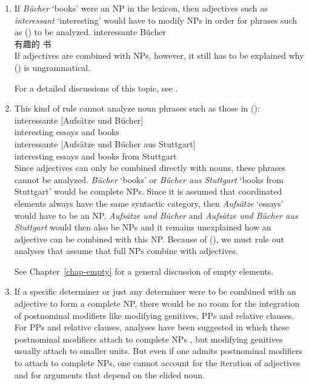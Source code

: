 \begin{enumerate}
\item %

If \emph{Bücher} `books' were an NP in the lexicon, then adjectives such as \emph{interessant} `interesting' would have to modify
NPs in order for phrases such as () to be analyzed.
\ea
\gll interessante Bücher\\
     有趣的 书\\
\z
If adjectives are combined with NPs, however, it still has to be explained why () is ungrammatical.
\z

For a detailed discussions of this topic, see .\nocite{MuellerLehrbuch1}

\item %

This kind of rule cannot analyze noun phrases such as those in ():
\eal
\ex 
\gll interessante [Aufsätze und Bücher]\\
     interesting \spacebr{}essays and books\\
\ex 
\gll interessante [Aufsätze und Bücher aus Stuttgart]\\
     interesting \spacebr{}essays and books from Stuttgart\\
\zl
Since adjectives can only be combined directly with nouns, these phrases cannot be analyzed. 
 \emph{Bücher} `books' or \emph{Bücher aus Stuttgart} `books from Stuttgart' would be complete NPs.
 Since it is assumed that coordinated elements always have the same syntactic category, then \emph{Aufsätze} `essays'
 would have to be an NP. \emph{Aufsätze und Bücher} and \emph{Aufsätze und Bücher aus
  Stuttgart} would then also be NPs and it remains unexplained how an adjective can be combined with this NP.
Because of (), we must rule out analyses that assume that full NPs combine with adjectives.

See Chapter~\ref{chap-empty} for a general discussion of empty elements.

\item 
If a specific determiner or just any determiner were to be combined with an adjective to form a
complete NP, there would be no room for the integration of postnominal modifiers like modifying
genitives, PPs and relative clauses. For PPs and relative clauses, analyses have been suggested in
which these postnominal modifiers attach to complete NPs \citep{Kiss2005a}, but modifying genitives usually attach to
smaller units. But even if one admits postnominal modifiers to attach to complete NPs, one cannot
account for the iteration of adjectives and for arguments that depend on the elided noun.
 

\end{enumerate}
